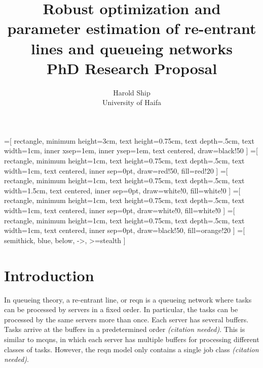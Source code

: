 \documentclass[11pt,a4paper,titlepage]{article}
\title{Robust optimization and parameter estimation of re-entrant lines and
    queueing networks \\ PhD Research Proposal}
\author{Harold Ship \\ University of Haifa}
\newcommand\needc{{\color{purple}\textit{(citation needed)}}}
\theoremstyle{definition}
\begin{document}
=[%
rectangle,
minimum height=3cm,
text height=0.75cm,
text depth=.5cm,
text width=1cm,
inner xsep=1em,
inner ysep=1em,
text centered,
draw=black!50
]
=[%
rectangle,
minimum height=1cm,
text height=0.75cm,
text depth=.5cm,
text width=1cm,
text centered,
inner sep=0pt,
draw=red!50,
fill=red!20
]
=[%
rectangle,
minimum height=1cm,
text height=0.75cm,
text depth=.5cm,
text width=1.5cm,
text centered,
inner sep=0pt,
draw=white!0,
fill=white!0
]
=[%
rectangle,
minimum height=1cm,
text height=0.75cm,
text depth=.5cm,
text width=1cm,
text centered,
inner sep=0pt,
draw=white!0,
fill=white!0
]
=[%
rectangle,
minimum height=1cm,
text height=0.75cm,
text depth=.5cm,
text width=1cm,
text centered,
inner sep=0pt,
draw=black!50,
fill=orange!20
]
=[%
semithick,
blue,
below,
->,
>=stealth
]



\maketitle \clearpage
\tableofcontents \clearpage
\iffalse %
\listoffigures \clearpage
\fi
\iffalse %
\listoftables \clearpage
\fi
\printglossaries \clearpage


\setcounter{page}{1}


\section{Introduction}
\label{sec:introduction}

In queueing theory,
a re-entrant line,
or \gls{reqn} is a queueing network where tasks can be processed by servers
in a fixed order.
In particular,
the tasks can be processed by the same servers more than once.
Each server has several buffers.
Tasks arrive at the buffers in a predetermined order \needc.
This is similar to \glspl{mcqn},
in which each server has multiple buffers for processing different classes of
tasks.
However, the \gls{reqn} model only contains a single job class \needc.
\end{document}
